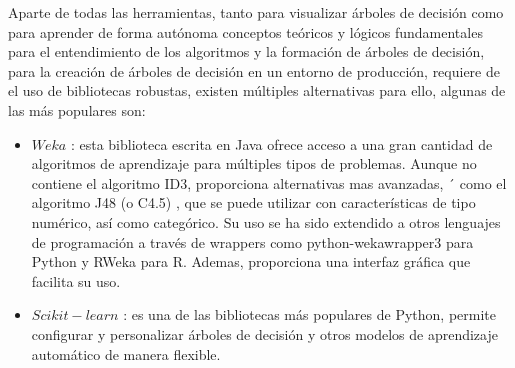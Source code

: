 Aparte de todas las herramientas, tanto para visualizar árboles de decisión como para aprender de forma autónoma conceptos teóricos y lógicos fundamentales para el entendimiento de los algoritmos y la formación de árboles de decisión, para la creación de árboles de decisión en un entorno de producción, requiere de el uso de bibliotecas robustas, existen múltiples alternativas para ello, algunas de las más populares son:

\begin{itemize}

    \item $Weka$ \cite{frank2016WekaWorkbench}: esta biblioteca escrita en Java ofrece acceso a una gran cantidad de algoritmos de aprendizaje para múltiples tipos de problemas. Aunque no contiene el algoritmo ID3, proporciona alternativas mas avanzadas, ´ como el algoritmo J48 (o C4.5) \cite{quinlan2014C45}, que se puede utilizar con características de tipo numérico, así como categórico. Su uso se ha sido extendido a otros lenguajes de programación a través de wrappers como python-wekawrapper3 \cite{fracpete2026PythonWekaWrapper3} para Python y RWeka \cite{hornik2026RWeka} para R. Ademas, proporciona una interfaz gráfica que facilita su uso.

    \item $Scikit-learn$ \cite{pedregosa2011ScikitLearn}: es una de las bibliotecas más populares de Python, permite configurar y personalizar árboles de decisión y otros modelos de aprendizaje automático de manera flexible.
    
\end{itemize}
